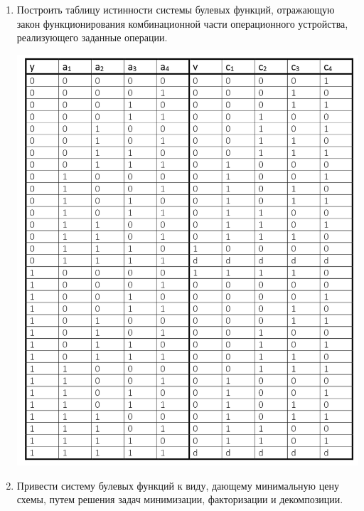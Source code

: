 \documentclass{article}
\begin{document}
\begin{enumerate}
       \item Построить таблицу истинности системы булевых функций, отражающую закон функционирования комбинационной части операционного
       устройства, реализующего заданные операции.
       \begin{center}
              \includegraphics[scale=0.8]{table.png}
       \end{center}
       \item Привести систему булевых функций к виду, дающему минимальную цену схемы, путем решения задач минимизации, факторизации и декомпозиции.


\end{enumerate}
\end{document}
